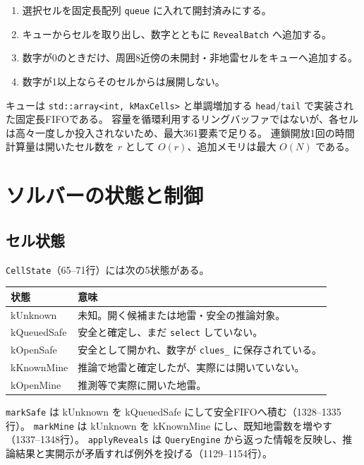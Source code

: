 \documentclass[uplatex,dvipdfmx,11pt]{jsarticle}
\newcommand{\code}[1]{\texttt{#1}}
\newcommand{\State}[1]{\textsf{#1}}
\begin{document}
\begin{enumerate}
  \item 選択セルを固定長配列 \code{queue} に入れて開封済みにする。
  \item キューからセルを取り出し、数字とともに \code{RevealBatch} へ追加する。
  \item 数字が0のときだけ、周囲8近傍の未開封・非地雷セルをキューへ追加する。
  \item 数字が1以上ならそのセルからは展開しない。
\end{enumerate}

キューは \code{std::array<int, kMaxCells>} と単調増加する \code{head}/\code{tail} で実装された固定長FIFOである。
容量を循環利用するリングバッファではないが、各セルは高々一度しか投入されないため、最大361要素で足りる。
連鎖開放1回の時間計算量は開いたセル数を $r$ として $O(r)$、追加メモリは最大 $O(N)$ である。

\section{ソルバーの状態と制御}

\subsection{セル状態}
\code{CellState}（65--71行）には次の5状態がある。

\begin{center}
\begin{tabular}{ll}
\toprule
状態 & 意味 \\
\midrule
\State{kUnknown} & 未知。開く候補または地雷・安全の推論対象。\\
\State{kQueuedSafe} & 安全と確定し、まだ \code{select} していない。\\
\State{kOpenSafe} & 安全として開かれ、数字が \code{clues\_} に保存されている。\\
\State{kKnownMine} & 推論で地雷と確定したが、実際には開いていない。\\
\State{kOpenMine} & 推測等で実際に開いた地雷。\\
\bottomrule
\end{tabular}
\end{center}

\code{markSafe} は \State{kUnknown} を \State{kQueuedSafe} にして安全FIFOへ積む（1328--1335行）。
\code{markMine} は \State{kUnknown} を \State{kKnownMine} にし、既知地雷数を増やす（1337--1348行）。
\code{applyReveals} は \code{QueryEngine} から返った情報を反映し、推論結果と実開示が矛盾すれば例外を投げる（1129--1154行）。
\end{document}
